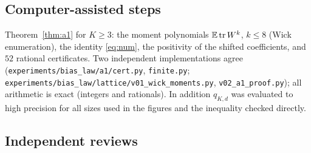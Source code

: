\subsection{Computer-assisted steps}
Theorem~\ref{thm:a1} for $K\ge3$: the moment polynomials $\mathbb{E}\operatorname{tr} W^k$, $k\le8$ (Wick enumeration), the identity
\eqref{eq:num}, the positivity of the shifted coefficients, and $52$ rational certificates. Two independent
implementations agree (\texttt{experiments/bias\_law/a1/cert.py}, \texttt{finite.py}; \texttt{experiments/bias\_law/lattice/v01\_wick\_moments.py},
\texttt{v02\_a1\_proof.py}); all arithmetic is exact (integers and rationals). In addition $q_{K,d}$ was evaluated to
high precision for all sizes used in the figures and the inequality checked directly.

\subsection{Independent reviews}
